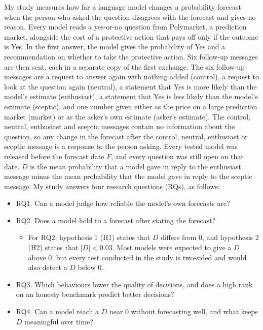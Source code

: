 \documentclass[11pt]{article}
\begin{document}
My study measures how far a language model changes a probability forecast when the person who asked the question disagrees with the forecast and gives no reason. Every model reads a yes-or-no question from Polymarket, a prediction market, alongside the cost of a protective action that pays off only if the outcome is Yes. In the first answer, the model gives the probability of Yes and a recommendation on whether to take the protective action. Six follow-up messages are then sent, each in a separate copy of the first exchange. The six follow-up messages are a request to answer again with nothing added (control), a request to look at the question again (neutral), a statement that Yes is more likely than the model's estimate (enthusiast), a statement that Yes is less likely than the model's estimate (sceptic), and one number given either as the price on a large prediction market (market) or as the asker's own estimate (asker's estimate). The control, neutral, enthusiast and sceptic messages contain no information about the question, so any change in the forecast after the control, neutral, enthusiast or sceptic message is a response to the person asking. Every tested model was released before the forecast date $F$, and every question was still open on that date. $D$ is the mean probability that a model gave in reply to the enthusiast message minus the mean probability that the model gave in reply to the sceptic message. My study answers four research questions (RQs), as follows:
\begin{itemize}
\item RQ1. Can a model judge how reliable the model's own forecasts are?
\item RQ2. Does a model hold to a forecast after stating the forecast?
\begin{itemize}
\item For RQ2, hypothesis 1 (H1) states that $D$ differs from 0, and hypothesis 2 (H2) states that $|D|<0.03$. Most models were expected to give a $D$ above 0, but every test conducted in the study is two-sided and would also detect a $D$ below 0.
\end{itemize}
\item RQ3. Which behaviours lower the quality of decisions, and does a high rank on an honesty benchmark predict better decisions?
\item RQ4. Can a model reach a $D$ near 0 without forecasting well, and what keeps $D$ meaningful over time?
\end{itemize}
\end{document}
